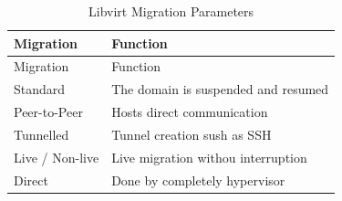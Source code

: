 \documentclass[
  14pt,
  english,
  a4paper,
]{scrreprt}
\begin{document}
\hypertarget{tbl:lvirt_mig_param}{}
\begin{longtable}[]{@{}ll@{}}
\caption{\label{tbl:lvirt_mig_param}Libvirt Migration
Parameters}\tabularnewline
\toprule
\begin{minipage}[b]{0.24\columnwidth}\raggedright
Migration\strut
\end{minipage} & \begin{minipage}[b]{0.50\columnwidth}\raggedright
Function\strut
\end{minipage}\tabularnewline
\midrule
\endfirsthead
\toprule
\begin{minipage}[b]{0.24\columnwidth}\raggedright
Migration\strut
\end{minipage} & \begin{minipage}[b]{0.50\columnwidth}\raggedright
Function\strut
\end{minipage}\tabularnewline
\midrule
\endhead
\begin{minipage}[t]{0.24\columnwidth}\raggedright
Standard\strut
\end{minipage} & \begin{minipage}[t]{0.50\columnwidth}\raggedright
The domain is suspended and resumed\strut
\end{minipage}\tabularnewline
\begin{minipage}[t]{0.24\columnwidth}\raggedright
Peer-to-Peer\strut
\end{minipage} & \begin{minipage}[t]{0.50\columnwidth}\raggedright
Hosts direct communication\strut
\end{minipage}\tabularnewline
\begin{minipage}[t]{0.24\columnwidth}\raggedright
Tunnelled\strut
\end{minipage} & \begin{minipage}[t]{0.50\columnwidth}\raggedright
Tunnel creation sush as SSH\strut
\end{minipage}\tabularnewline
\begin{minipage}[t]{0.24\columnwidth}\raggedright
Live / Non-live\strut
\end{minipage} & \begin{minipage}[t]{0.50\columnwidth}\raggedright
Live migration withou interruption\strut
\end{minipage}\tabularnewline
\begin{minipage}[t]{0.24\columnwidth}\raggedright
Direct\strut
\end{minipage} & \begin{minipage}[t]{0.50\columnwidth}\raggedright
Done by completely hypervisor\strut
\end{minipage}\tabularnewline
\bottomrule
\end{longtable}
\end{document}
